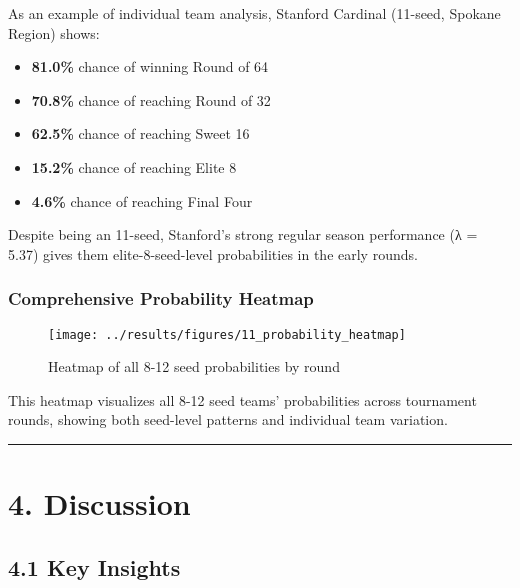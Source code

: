 \documentclass[
]{article}
\providecommand{\tightlist}{%
  \setlength{\itemsep}{0pt}\setlength{\parskip}{0pt}}
\begin{document}
As an example of individual team analysis, Stanford Cardinal (11-seed,
Spokane Region) shows:

\begin{itemize}
\tightlist
\item
  \textbf{81.0\%} chance of winning Round of 64
\item
  \textbf{70.8\%} chance of reaching Round of 32
\item
  \textbf{62.5\%} chance of reaching Sweet 16
\item
  \textbf{15.2\%} chance of reaching Elite 8
\item
  \textbf{4.6\%} chance of reaching Final Four
\end{itemize}

Despite being an 11-seed, Stanford's strong regular season performance
(λ = 5.37) gives them elite-8-seed-level probabilities in the early
rounds.

\subsubsection{Comprehensive Probability
Heatmap}\label{comprehensive-probability-heatmap}

\begin{figure}

{\centering \texttt{[image: ../results/figures/11\_probability\_heatmap]} 

}

\caption{Heatmap of all 8-12 seed probabilities by round}\label{fig:probability-heatmap}
\end{figure}

This heatmap visualizes all 8-12 seed teams' probabilities across
tournament rounds, showing both seed-level patterns and individual team
variation.

\begin{center}\rule{0.5\linewidth}{0.5pt}\end{center}

\section{4. Discussion}\label{discussion}

\subsection{4.1 Key Insights}\label{key-insights}
\end{document}
